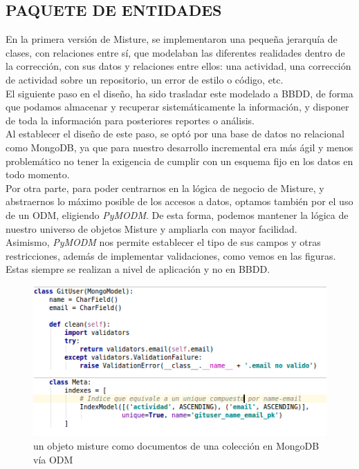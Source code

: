 \subsection{PAQUETE DE ENTIDADES} 
\label{subsec:paq_entities}

En la primera versión de Misture, se implementaron una pequeña jerarquía de clases, con relaciones entre sí, que modelaban las diferentes realidades dentro de la corrección, con sus datos y relaciones entre ellos: una actividad, una corrección de actividad sobre un repositorio, un error de estilo o código, etc.\\


El siguiente paso en el diseño, ha sido trasladar este modelado a BBDD, de forma que podamos almacenar y recuperar sistemáticamente la información, y disponer de toda la información para posteriores reportes o análisis.\\


Al establecer el diseño de este paso, se optó por una base de datos no relacional como MongoDB, ya que para nuestro desarrollo incremental era más ágil y menos problemático no tener la exigencia de cumplir con un esquema fijo en los datos en todo momento.\\


Por otra parte, para poder centrarnos en la lógica de negocio de Misture, y abstraernos lo máximo posible de los accesos a datos, optamos también por el uso de un ODM, eligiendo \textit{PyMODM}. De esta forma, podemos mantener la lógica de nuestro universo de objetos Misture y ampliarla con mayor facilidad.\\


Asimismo, \textit{PyMODM} nos permite establecer el tipo de sus campos y otras restricciones, además de implementar validaciones, como vemos en las figuras. Estas siempre se realizan a nivel de aplicación y no en BBDD.\\


\begin{figure}[H]
   \centering
   \includegraphics[width=16cm]{img/Selection_026_mongomodel}
   \caption{un objeto misture como documentos de una colección en MongoDB vía ODM}
   \label{figura:iter2}
\end{figure}

